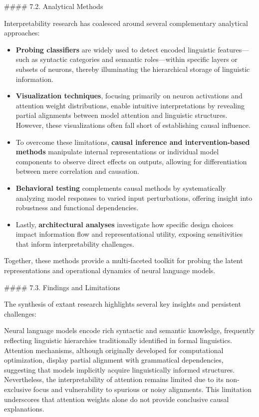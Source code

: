 \documentclass[11pt]{article}
\begin{document}
#### 7.2. Analytical Methods

Interpretability research has coalesced around several complementary analytical approaches:

\begin{itemize}
  \item \textbf{Probing classifiers} are widely used to detect encoded linguistic features—such as syntactic categories and semantic roles—within specific layers or subsets of neurons, thereby illuminating the hierarchical storage of linguistic information.
  \item \textbf{Visualization techniques}, focusing primarily on neuron activations and attention weight distributions, enable intuitive interpretations by revealing partial alignments between model attention and linguistic structures. However, these visualizations often fall short of establishing causal influence.
  \item To overcome these limitations, \textbf{causal inference and intervention-based methods} manipulate internal representations or individual model components to observe direct effects on outputs, allowing for differentiation between mere correlation and causation.
  \item \textbf{Behavioral testing} complements causal methods by systematically analyzing model responses to varied input perturbations, offering insight into robustness and functional dependencies.
  \item Lastly, \textbf{architectural analyses} investigate how specific design choices impact information flow and representational utility, exposing sensitivities that inform interpretability challenges.
\end{itemize}

Together, these methods provide a multi-faceted toolkit for probing the latent representations and operational dynamics of neural language models.

#### 7.3. Findings and Limitations

The synthesis of extant research highlights several key insights and persistent challenges:

Neural language models encode rich syntactic and semantic knowledge, frequently reflecting linguistic hierarchies traditionally identified in formal linguistics. Attention mechanisms, although originally developed for computational optimization, display partial alignment with grammatical dependencies, suggesting that models implicitly acquire linguistically informed structures. Nevertheless, the interpretability of attention remains limited due to its non-exclusive focus and vulnerability to spurious or noisy alignments. This limitation underscores that attention weights alone do not provide conclusive causal explanations.
\end{document}
